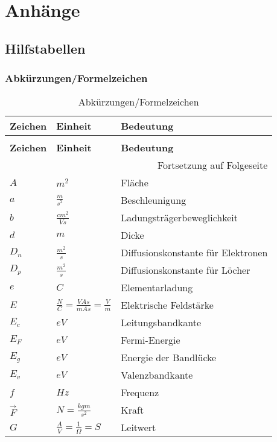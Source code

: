 \documentclass[12pt,a4paper]{report}%
\numberwithin{equation}{section}
\numberwithin{equation}{section}
\begin{document}
\chapter{Anhänge}
\section{Hilfstabellen}
	\subsection{Abkürzungen/Formelzeichen} \label{ch:names}
	\renewcommand{\arraystretch}{1.5}
	\begin{longtable} {|p{2cm}|p{3cm}|p{8.4cm}|} \hline
	\textbf{Zeichen} & \textbf{Einheit} & \textbf{Bedeutung} \\
	\hline
	\endfirsthead %
	\caption{Abkürzungen/Formelzeichen}\\ \hline
	\textbf{Zeichen} & \textbf{Einheit} & \textbf{Bedeutung} \\
	\hline
	\endhead %
	\multicolumn{3}{r}{Fortsetzung auf Folgeseite}\\
	\endfoot
	\hline
	\endlastfoot
	
	$A$ & $m^2$ & Fläche \\ \hline
	$a$ & $\frac{m}{s^2}$ & Beschleunigung \\ \hline
	$b$ & $\frac{cm^2}{Vs}$ & Ladungsträgerbeweglichkeit \\ \hline
	$d$ & $m$ & Dicke \\ \hline
	$D_n$ & $\frac{m^2}{s}$ & Diffusionskonstante für Elektronen \\ \hline
	$D_p$ & $\frac{m^2}{s}$ & Diffusionskonstante für Löcher \\ \hline
	$e$ & $C$ & Elementarladung \\ \hline
	$E$ & $\frac{N}{C} = \frac{VAs}{mAs} = \frac{V}{m}$ & Elektrische Feldstärke \\ \hline
	$E_c$ & $eV$ & Leitungsbandkante \\ \hline
	$E_F$ & $eV$ & Fermi-Energie \\ \hline
	$E_g$ & $eV$ & Energie der Bandlücke \\ \hline
	$E_v$ & $eV$ & Valenzbandkante \\ \hline
	$f$ & $Hz$ & Frequenz \\ \hline
	$\vec{F}$ & $N = \frac{kgm}{s^2}$ & Kraft \\ \hline
	$G$ & $\frac{A}{V} = \frac{1}{\Omega} = S$ & Leitwert \\ \hline
	

\end{longtable}
\end{document}
